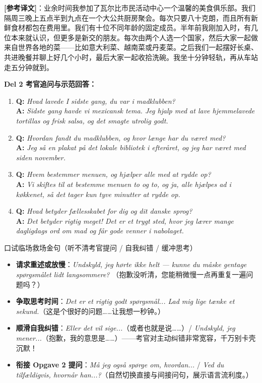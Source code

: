 \begin{answerbox}
\vspace{0.2em}
\small\textbf{[参考译文]}：业余时间我参加了瓦尔比市民活动中心一个温馨的美食俱乐部。我们隔周三晚上五点半到九点在一个大公共厨房聚会。每次只要八十克朗，而且所有新鲜食材都包在费用里。我们有十位不同年龄的固定成员。半年前我刚加入时，有几位本来就认识，但更多是新交的朋友。每次由两个人选一个国家，然后大家一起做来自世界各地的菜——比如意大利菜、越南菜或丹麦菜。之后我们一起摆好长桌、共进晚餐并聊上好几个小时，最后大家一起收拾洗碗。我坐十分钟轻轨，再从车站走五分钟就到。

\vspace{0.25em}
\textbf{\color{NCDRed}Del 2 考官追问与示范回答：}
\begin{enumerate}
  \item \textbf{Q:} \textit{Hvad lavede I sidste gang, du var i madklubben?}\\
  \textbf{A:} \textit{Sidste gang havde vi mexicansk tema. Jeg hjalp med at lave hjemmelavede tortillas og frisk salsa, og det smagte utrolig godt.}
  \item \textbf{Q:} \textit{Hvordan fandt du madklubben, og hvor længe har du været med?}\\
  \textbf{A:} \textit{Jeg så en plakat på det lokale bibliotek i efteråret, og jeg har været med siden november.}
  \item \textbf{Q:} \textit{Hvem bestemmer menuen, og hjælper alle med at rydde op?}\\
  \textbf{A:} \textit{Vi skiftes til at bestemme menuen to og to, og ja, alle hjælpes ad i køkkenet, så det tager kun tyve minutter at rydde op.}
  \item \textbf{Q:} \textit{Hvad betyder fællesskabet for dig og dit danske sprog?}\\
  \textbf{A:} \textit{Det betyder rigtig meget! Det er et trygt sted, hvor jeg lærer mange dagligdags ord om mad og får gode venner i nabolaget.}
\end{enumerate}
\end{answerbox}

\begin{tipbox}{口试临场救场金句（听不清考官提问 / 自我纠错 / 缓冲思考）}
\small
\begin{itemize}
  \item \textbf{请求重述或放慢}：\textit{Undskyld, jeg hørte ikke helt --- kunne du måske gentage spørgsmålet lidt langsommere?} （抱歉没听清，您能稍微慢一点再重复一遍问题吗？）
  \item \textbf{争取思考时间}：\textit{Det er et rigtig godt spørgsmål... Lad mig lige tænke et sekund.}（这是个很好的问题……让我想一秒钟。）
  \item \textbf{顺滑自我纠错}：\textit{Eller det vil sige...}（或者也就是说……）/ \textit{Undskyld, jeg mener...}（抱歉，我的意思是……）——考官对主动纠错非常宽容，千万别卡壳沉默！
  \item \textbf{衔接 Opgave 2 提问}：\textit{Må jeg også spørge om, hvordan...} / \textit{Ved du tilfældigvis, hvornår han...?}（自然切换直接与间接问句，展示语言流利度。）
\end{itemize}
\end{tipbox}

